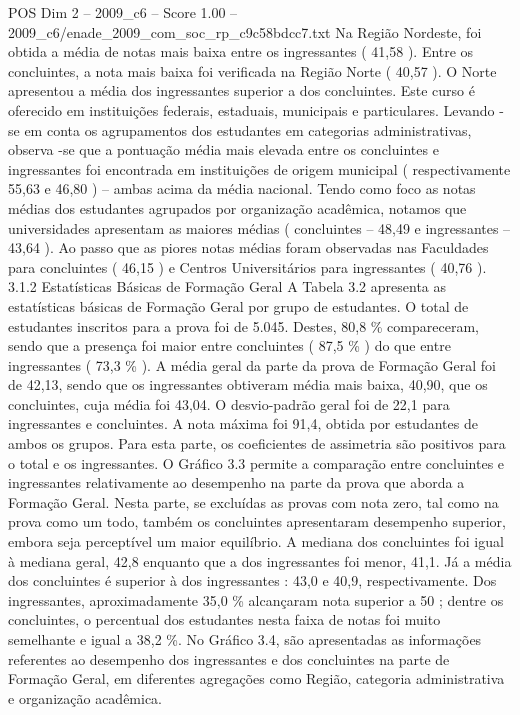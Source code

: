 \begin{textsample}{POS Dim 2 – 2009\_c6 – Score 1.00 – 2009\_c6/enade\_2009\_com\_soc\_rp\_c9c58bdcc7.txt}
Na Região Nordeste, foi obtida a média de notas mais baixa entre os ingressantes ( 41,58 ).
Entre os concluintes, a nota mais baixa foi verificada na Região Norte ( 40,57 ).
O Norte apresentou a média dos ingressantes superior a dos concluintes.
Este curso é oferecido em instituições federais, estaduais, municipais e particulares.
Levando -se em conta os agrupamentos dos estudantes em categorias administrativas, observa -se que a pontuação média mais elevada entre os concluintes e ingressantes foi encontrada em instituições de origem municipal ( respectivamente 55,63 e 46,80 ) – ambas acima da média nacional.
Tendo como foco as notas médias dos estudantes agrupados por organização acadêmica, notamos que universidades apresentam as maiores médias ( concluintes – 48,49 e ingressantes – 43,64 ).
Ao passo que as piores notas médias foram observadas nas Faculdades para concluintes ( 46,15 ) e Centros Universitários para ingressantes ( 40,76 ). 3.1.2 Estatísticas Básicas de Formação Geral A Tabela 3.2 apresenta as estatísticas básicas de Formação Geral por grupo de estudantes.
O total de estudantes inscritos para a prova foi de 5.045.
Destes, 80,8 \% compareceram, sendo que a presença foi maior entre concluintes ( 87,5 \% ) do que entre ingressantes ( 73,3 \% ).
A média geral da parte da prova de Formação Geral foi de 42,13, sendo que os ingressantes obtiveram média mais baixa, 40,90, que os concluintes, cuja média foi 43,04.
O desvio-padrão geral foi de 22,1 para ingressantes e concluintes.
A nota máxima foi 91,4, obtida por estudantes de ambos os grupos.
Para esta parte, os coeficientes de assimetria são positivos para o total e os ingressantes.
O Gráfico 3.3 permite a comparação entre concluintes e ingressantes relativamente ao desempenho na parte da prova que aborda a Formação Geral.
Nesta parte, se excluídas as provas com nota zero, tal como na prova como um todo, também os concluintes apresentaram desempenho superior, embora seja perceptível um maior equilíbrio.
A mediana dos concluintes foi igual à mediana geral, 42,8 enquanto que a dos ingressantes foi menor, 41,1.
Já a média dos concluintes é superior à dos ingressantes : 43,0 e 40,9, respectivamente.
Dos ingressantes, aproximadamente 35,0 \% alcançaram nota superior a 50 ; dentre os concluintes, o percentual dos estudantes nesta faixa de notas foi muito semelhante e igual a 38,2 \%.
No Gráfico 3.4, são apresentadas as informações referentes ao desempenho dos ingressantes e dos concluintes na parte de Formação Geral, em diferentes agregações como Região, categoria administrativa e organização acadêmica.

\end{textsample}
